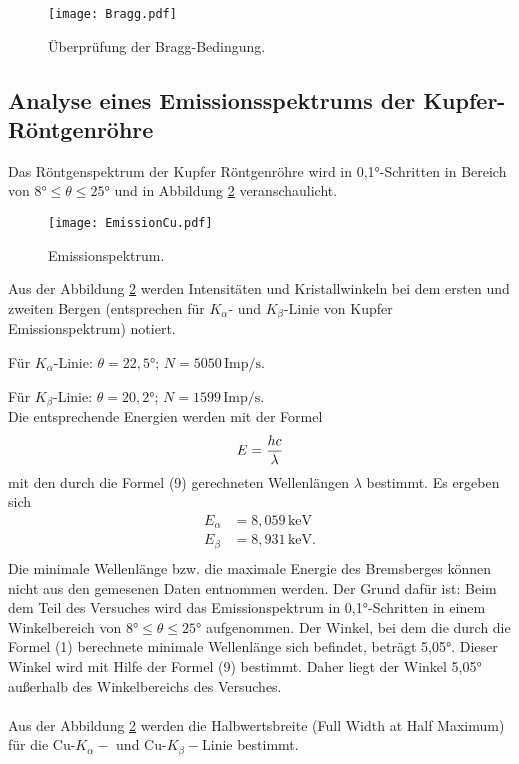 \begin{figure}[H]
    \centering
    \texttt{[image: Bragg.pdf]}
    \caption{Überprüfung der Bragg-Bedingung.}
    \label{fig:Bragg}
  \end{figure}
  \newpage 
\subsection{Analyse eines Emissionsspektrums der Kupfer-Röntgenröhre}
Das Röntgenspektrum \cite{AL} der Kupfer Röntgenröhre wird in 0,1°-Schritten in Bereich  von \(8° \leq \theta \leq 25°\) und in Abbildung \ref{fig:EmissionCu} veranschaulicht.

\begin{figure}[H]
    \centering
    \texttt{[image: EmissionCu.pdf]}
    \caption{Emissionspektrum.}
    \label{fig:EmissionCu}
  \end{figure}


Aus der Abbildung \ref{fig:EmissionCu} werden Intensitäten und Kristallwinkeln bei dem ersten und zweiten Bergen (entsprechen für $K_\alpha$- und $K_\beta$-Linie von Kupfer Emissionspektrum) notiert.

Für $K_\alpha$-Linie: \(\theta=22,5°\); \(N=5050 \, \mathrm{Imp/s}\).

Für $K_\beta$-Linie: \(\theta=20,2°\); \(N=1599 \,\mathrm{Imp/s}\). \\

Die entsprechende Energien werden mit der Formel
\begin{equation}
  E = \frac{hc}{\lambda}\\
 \end{equation}
mit den durch die Formel (9) gerechneten Wellenlängen $\lambda$
bestimmt. Es ergeben sich
\begin{align*}
  E_\alpha &= 8,059\,\mathrm{keV}\\
  E_\beta &= 8,931 \,\mathrm{keV}.\\
\end{align*}
Die minimale Wellenlänge bzw. die maximale Energie des Bremsberges können nicht aus den gemesenen Daten entnommen werden. 
Der Grund dafür ist: Beim dem Teil des Versuches wird das Emissionspektrum in 0,1°-Schritten in einem Winkelbereich von \(8° \leq \theta \leq 25°\) aufgenommen.
Der Winkel, bei dem die durch die Formel (1) berechnete minimale Wellenlänge sich befindet, beträgt 5,05°. Dieser Winkel wird mit Hilfe der Formel (9) bestimmt.
Daher liegt der Winkel 5,05° au{\ss}erhalb des Winkelbereichs des Versuches.
\paragraph{}
Aus der Abbildung \ref{fig:EmissionCu} werden die Halbwertsbreite (Full Width at Half Maximum) für die Cu-$K_\alpha-$ und Cu-$K_\beta-$Linie bestimmt.
